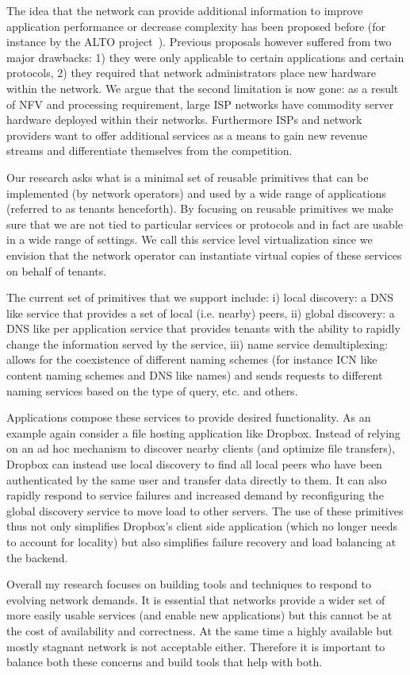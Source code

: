 \documentclass[letterpaper]{article}
\begin{document}
The idea that the network can provide additional information to improve application performance or decrease complexity
has been proposed before (for instance by the ALTO project~\cite{seedorf2009traffic}). Previous proposals however
suffered from two major drawbacks: 1) they were only applicable to certain applications and certain protocols, 2) they
required that network administrators place new hardware within the network. We argue that the second limitation is now
gone: as a result of NFV and processing requirement, large ISP networks have commodity server hardware deployed within
their networks. Furthermore ISPs and network providers want to offer additional services as a means to gain new revenue
streams and differentiate themselves from the competition.

Our research asks what is a minimal set of reusable primitives that can be implemented (by network operators) and used
by a wide range of applications (referred to as tenants henceforth). By focusing on reusable primitives we make sure
that we are not tied to particular services or protocols and in fact are usable in a wide range of settings. We call
this service level virtualization since we envision that the network operator can instantiate virtual copies of these
services on behalf of tenants.

The current set of primitives that we support include: i) local discovery: a DNS like service that provides a
set of local (i.e. nearby) peers, ii) global discovery: a DNS like per application service that provides
tenants with the ability to rapidly change the information served by the service, iii) name service
demultiplexing: allows for the coexistence of different naming schemes (for instance ICN like content naming
schemes and DNS like names) and sends requests to different naming services based on the type of query, etc.
and others.

Applications compose these services to provide desired functionality. As an example again consider a file hosting
application like Dropbox. Instead of relying on an ad hoc mechanism to discover nearby clients (and optimize file
transfers), Dropbox can instead use local discovery to find all local peers who have been authenticated by the same user
and transfer data directly to them. It can also rapidly respond to service failures and increased demand by
reconfiguring the global discovery service to move load to other servers. The use of these primitives thus not only simplifies
Dropbox's client side application (which no longer needs to account for locality) but also simplifies failure recovery and load
balancing at the backend.

Overall my research focuses on building tools and techniques to respond to evolving network demands. It is essential
that networks provide a wider set of more easily usable services (and enable new applications) but this cannot be at the
cost of availability and correctness. At the same time a highly available but mostly stagnant network is not acceptable
either. Therefore it is important to balance both these concerns and build tools that help with both.


\end{document}
